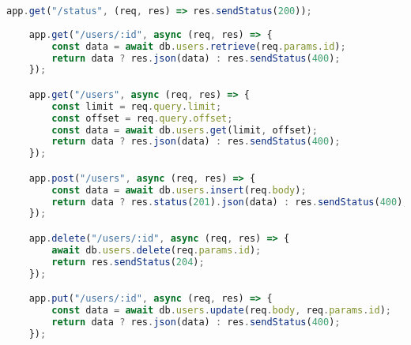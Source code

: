 \begin{lstlisting}[language=JavaScript,caption={Express.js routing and endpoint logic},breaklines=true,label={lst:expressEndpoints}]
    app.get("/status", (req, res) => res.sendStatus(200));
    
    app.get("/users/:id", async (req, res) => {
        const data = await db.users.retrieve(req.params.id);
        return data ? res.json(data) : res.sendStatus(400);
    });

    app.get("/users", async (req, res) => {
        const limit = req.query.limit;
        const offset = req.query.offset;
        const data = await db.users.get(limit, offset);
        return data ? res.json(data) : res.sendStatus(400);
    });

    app.post("/users", async (req, res) => {
        const data = await db.users.insert(req.body);
        return data ? res.status(201).json(data) : res.sendStatus(400);
    });

    app.delete("/users/:id", async (req, res) => {
        await db.users.delete(req.params.id);
        return res.sendStatus(204);
    });

    app.put("/users/:id", async (req, res) => {
        const data = await db.users.update(req.body, req.params.id);
        return data ? res.json(data) : res.sendStatus(400);
    });
\end{lstlisting}
